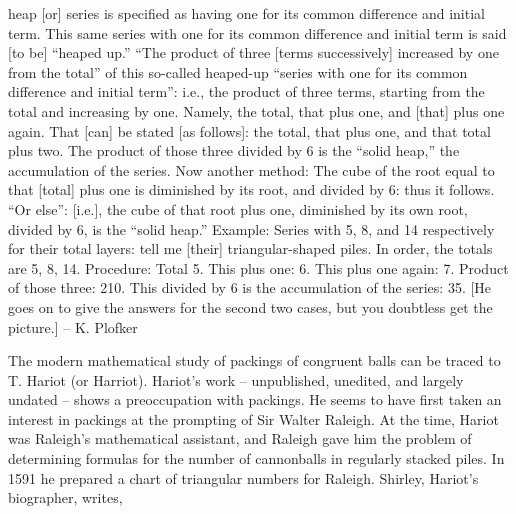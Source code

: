 { {\narrower
    [This] heap [or] series is specified as having one for its common
 difference and initial term. This same series with one for its common
 difference and initial term is said [to be] ``heaped up.'' ``The
 product of three [terms successively] increased by one from the total''
 of this so-called heaped-up ``series with one for its common
 difference and initial term'': i.e., the product of three terms, starting
 from the total and increasing by one. Namely, the total, that plus one,
 and [that] plus one again. That [can] be stated [as follows]: the total,
 that plus one, and that total plus two. The product of those three
 divided by 6 is the ``solid heap,'' the accumulation of the series.
 Now another method: The cube of the root equal to that [total] plus
 one is diminished by its root, and divided by 6: thus it follows.
 ``Or else'': [i.e.], the cube of that root plus one, diminished by
 its own root, divided by 6, is the ``solid heap.''
    Example: Series with 5, 8, and 14 respectively for their total layers:
 tell me [their] triangular-shaped piles.
    In order, the totals are 5, 8, 14.
    Procedure: Total 5. This plus one: 6. This plus one again: 7. Product
 of those three: 210. This divided by 6 is the accumulation of the series:
 35.
    [He goes on to give the answers for the second two cases, but you
 doubtless get the picture.]   --  K. Plofker
 }


}



The modern mathematical study of packings of congruent balls can be
traced to T. Hariot (or Harriot).  
Hariot's work -- unpublished, unedited,
and largely undated -- shows a preoccupation with packings.
He seems to have first taken an interest in packings at the
prompting of Sir Walter Raleigh.  
At the time, Hariot was Raleigh's
mathematical assistant,  and Raleigh gave him the problem of determining
formulas for the number of cannonballs in regularly stacked piles.
In 1591 he prepared a chart of triangular numbers for Raleigh.
Shirley, Hariot's biographer, writes,

